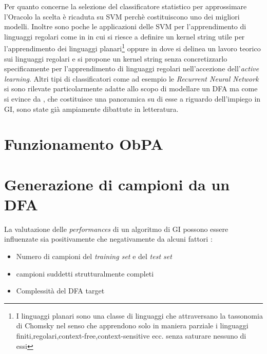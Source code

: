 Per quanto concerne la selezione del classificatore statistico per approssimare l'Oracolo la scelta è ricaduta su \ac{SVM} perchè costituiscono uno dei migliori modelli. Inoltre sono poche le applicazioni delle \ac{SVM} per l'apprendimento di linguaggi regolari come in \cite{Clark11}\cite{Clark06}  in cui si riesce a definire un kernel string utile per l'apprendimento dei linguaggi planari\footnote{I linguaggi planari sono una classe di linguaggi che attraversano la tassonomia di Chomsky nel senso che apprendono solo in maniera parziale i linguaggi finiti,regolari,context-free,context-sensitive ecc. senza saturare nessuno di essi}  oppure in \cite{Kontorovich09} dove si delinea un lavoro teorico sui linguaggi regolari e si propone un kernel string senza concretizzarlo specificamente per l'apprendimento di linguaggi regolari nell'accezione dell'\textit{active learning}. Altri tipi di classificatori come ad esempio le \textit{Recurrent Neural Network} si sono rilevate particolarmente adatte allo scopo di modellare un \ac{DFA} ma come si evince da \cite{Forcada02}, che costituisce una panoramica su di esse a riguardo dell'impiego in  \ac{GI}, sono state già ampiamente dibattute in letteratura.

\section{Funzionamento ObPA}

\section{Generazione di campioni da un DFA}
\label{sec:gensam}
La valutazione delle \textit{performances} di un algoritmo di \ac{GI} possono essere influenzate sia positivamente che negativamente da alcuni fattori \cite{Stamina10}: 
\begin{itemize}
\item Numero di campioni del \textit{training set} e del \textit{test set}
\item campioni suddetti strutturalmente completi
\item Complessità del \ac{DFA} target 
\end{itemize}

